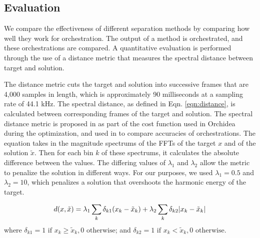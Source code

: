\documentclass{article}
\begin{document}
    \subsection{Evaluation}
    We compare the effectiveness of different separation methods by comparing how well they work for orchestration. The output of a method is orchestrated, and these orchestrations are compared. A quantitative evaluation is performed through the use of a distance metric that measures the spectral distance between target and solution. 
    
    The distance metric cuts the target and solution into successive frames that are 4,000 samples in length, which is approximately 90 milliseconds at a sampling rate of 44.1 kHz. The spectral distance, as defined in Eqn. \ref{eqn:distance}, is calculated between corresponding frames of the target and solution. The spectral distance metric is proposed in \cite{Cella2020} as part of the cost function used in Orchidea during the optimization, and used in \cite{Cella2020b} to compare accuracies of orchestrations. The equation takes in the magnitude spectrums of the FFTs of the target $x$ and of the solution $\tilde{x}$. Then for each bin $k$ of these spectrums, it calculates the absolute difference between the values. The differing values of $\lambda_1$ and $\lambda_2$ allow the metric to penalize the solution in different ways. For our purposes, we used $\lambda_1 = 0.5$ and $\lambda_2 = 10$, which penalizes a solution that overshoots the harmonic energy of the target.
    
    \begin{equation}\label{eqn:distance}
d(x, \tilde{x}) =\lambda_1 \sum_k \delta_{k1}(x_k - \tilde{x}_k) + \lambda_2 \sum_k \delta_{k2}|x_k - \tilde{x  }_k| \\
\end{equation}
where $\delta_{k1} = 1 \text{  if  } x_k \ge \tilde{x}_k, 0 \text{  otherwise}$; and $\delta_{k2} = 1 \text{  if  } x_k < \tilde{x}_k, 0 \text{  otherwise}$.


%
  
\end{document}
